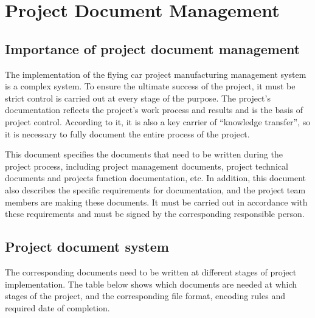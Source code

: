 \chapter{Project Document Management}

\section{Importance of project document management}

The implementation of the flying car project manufacturing management system is a complex system. To ensure the ultimate success of the project, it must be strict control is carried out at every stage of the purpose. The project's documentation reflects the project's work process and results and is the basis of project control. According to it, it is also a key carrier of “knowledge transfer”, so it is necessary to fully document the entire process of the project.

This document specifies the documents that need to be written during the project process, including project management documents, project technical documents and projects function documentation, etc. In addition, this document also describes the specific requirements for documentation, and the project team members are making these documents. It must be carried out in accordance with these requirements and must be signed by the corresponding responsible person.

\section{Project document system}

The corresponding documents need to be written at different stages of project implementation. The table below shows which documents are needed at which stages of the project, and the corresponding file format, encoding rules and required date of completion.

